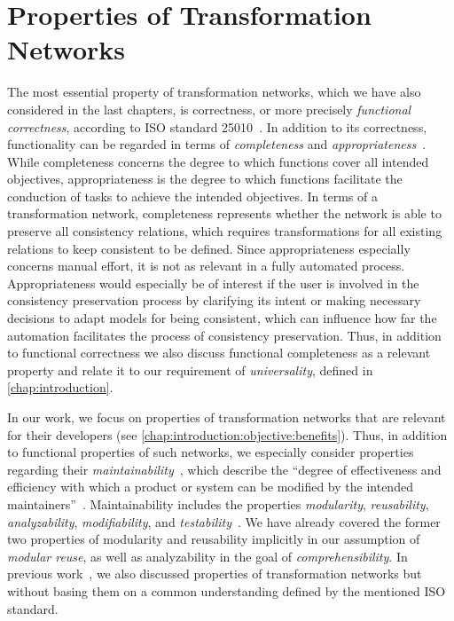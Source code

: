 \section{Properties of Transformation Networks}
\label{chap:classification:properties}

The most essential property of transformation networks, which we have also considered in the last chapters, is correctness, or more precisely \emph{functional correctness}, according to ISO standard 25010~\cite[p.~11]{iso25010}.
In addition to its correctness, functionality can be regarded in terms of \emph{completeness} and \emph{appropriateness}~\cite[p.~11]{iso25010}.
While completeness concerns the degree to which functions cover all intended objectives, appropriateness is the degree to which functions facilitate the conduction of tasks to achieve the intended objectives.
In terms of a transformation network, completeness represents whether the network is able to preserve all consistency relations, which requires transformations for all existing relations to keep consistent to be defined.
Since appropriateness especially concerns manual effort, it is not as relevant in a fully automated process. Appropriateness would especially be of interest if the user is involved in the consistency preservation process by clarifying its intent or making necessary decisions to adapt models for being consistent, which can influence how far the automation facilitates the process of consistency preservation.
Thus, in addition to functional correctness we also discuss functional completeness as a relevant property and relate it to our requirement of \emph{universality}, defined in \autoref{chap:introduction}.

In our work, we focus on properties of transformation networks that are relevant for their developers (see \autoref{chap:introduction:objective:benefits}).
Thus, in addition to functional properties of such networks, we especially consider properties regarding their \emph{maintainability}~\cite[Tab.~2]{iso25010}, which describe the \enquote{degree of effectiveness and efficiency with which a product or system can be modified by the intended maintainers}~\cite[p.~14]{iso25010}.
Maintainability includes the properties \emph{modularity}, \emph{reusability}, \emph{analyzability}, \emph{modifiability}, and \emph{testability}~\cite[pp.~14]{iso25010}.
We have already covered the former two properties of modularity and reusability implicitly in our assumption of \emph{modular reuse}, as well as analyzability in the goal of \emph{comprehensibility}.
In previous work~, we also discussed properties of transformation networks but without basing them on a common understanding defined by the mentioned ISO standard.



